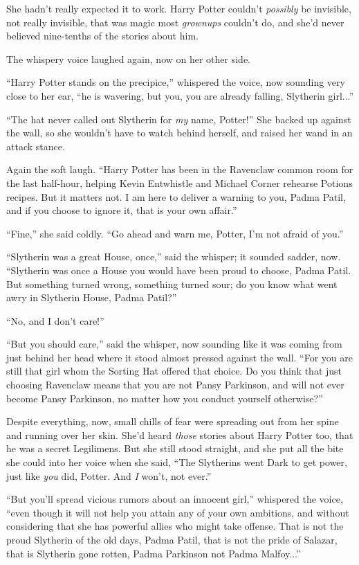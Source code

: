 She hadn't really expected it to work. Harry Potter couldn't \emph{possibly} be invisible, not really invisible, that was magic most \emph{grownups} couldn't do, and she'd never believed nine-tenths of the stories about him.

The whispery voice laughed again, now on her other side.

``Harry Potter stands on the precipice,'' whispered the voice, now sounding very close to her ear, ``he is wavering, but you, you are already falling, Slytherin girl...''

``The hat never called out Slytherin for \emph{my} name, Potter!'' She backed up against the wall, so she wouldn't have to watch behind herself, and raised her wand in an attack stance.

Again the soft laugh. ``Harry Potter has been in the Ravenclaw common room for the last half-hour, helping Kevin Entwhistle and Michael Corner rehearse Potions recipes. But it matters not. I am here to deliver a warning to you, Padma Patil, and if you choose to ignore it, that is your own affair.''

``Fine,'' she said coldly. ``Go ahead and warn me, Potter, I'm not afraid of you.''

``Slytherin was a great House, once,'' said the whisper; it sounded sadder, now. ``Slytherin was once a House you would have been proud to choose, Padma Patil. But something turned wrong, something turned sour; do you know what went awry in Slytherin House, Padma Patil?''

``No, and I don't care!''

``But you should care,'' said the whisper, now sounding like it was coming from just behind her head where it stood almost pressed against the wall. ``For you are still that girl whom the Sorting Hat offered that choice. Do you think that just choosing Ravenclaw means that you are not Pansy Parkinson, and will not ever become Pansy Parkinson, no matter how you conduct yourself otherwise?''

Despite everything, now, small chills of fear were spreading out from her spine and running over her skin. She'd heard \emph{those} stories about Harry Potter too, that he was a secret Legilimens. But she still stood straight, and she put all the bite she could into her voice when she said, ``The Slytherins went Dark to get power, just like \emph{you} did, Potter. And \emph{I} won't, not ever.''

``But you'll spread vicious rumors about an innocent girl,'' whispered the voice, ``even though it will not help you attain any of your own ambitions, and without considering that she has powerful allies who might take offense. That is not the proud Slytherin of the old days, Padma Patil, that is not the pride of Salazar, that is Slytherin gone rotten, Padma Parkinson not Padma Malfoy...''

